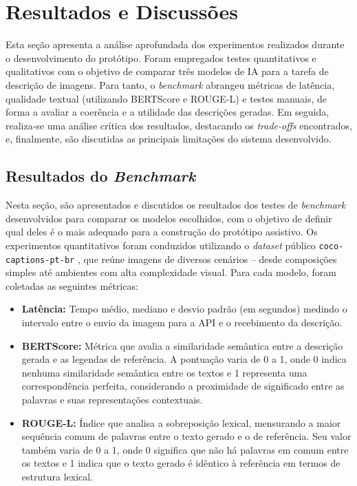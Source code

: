 \chapter{Resultados e Discussões} \label{cap:04}

Esta seção apresenta a análise aprofundada dos experimentos realizados durante o desenvolvimento do protótipo. Foram empregados testes quantitativos e qualitativos com o objetivo de comparar três modelos de IA para a tarefa de descrição de imagens. Para tanto, o \textit{benchmark} abrangeu métricas de latência, qualidade textual (utilizando BERTScore e ROUGE-L) e testes manuais, de forma a avaliar a coerência e a utilidade das descrições geradas. Em seguida, realiza-se uma análise crítica dos resultados, destacando os \textit{trade-offs} encontrados, e, finalmente, são discutidas as principais limitações do sistema desenvolvido.

\section{Resultados do \textit{Benchmark}}

Nesta seção, são apresentados e discutidos os resultados dos testes de \textit{benchmark} desenvolvidos para comparar os modelos escolhidos, com o objetivo de definir qual deles é o mais adequado para a construção do protótipo assistivo. Os experimentos quantitativos foram conduzidos utilizando o \textit{dataset} público \lstinline{coco-captions-pt-br} \cite{bromonschenkel2024cocopt}, que reúne imagens de diversos cenários – desde composições simples até ambientes com alta complexidade visual. Para cada modelo, foram coletadas as seguintes métricas:

\begin{itemize}
    \item \textbf{Latência:} Tempo médio, mediano e desvio padrão (em segundos) medindo o intervalo entre o envio da imagem para a API e o recebimento da descrição.
    \item \textbf{BERTScore:} Métrica que avalia a similaridade semântica entre a descrição gerada e as legendas de referência. A pontuação varia de 0 a 1, onde 0 indica nenhuma similaridade semântica entre os textos e 1 representa uma correspondência perfeita, considerando a proximidade de significado entre as palavras e suas representações contextuais.
    \item \textbf{ROUGE-L:} Índice que analisa a sobreposição lexical, mensurando a maior sequência comum de palavras entre o texto gerado e o de referência. Seu valor também varia de 0 a 1, onde 0 significa que não há palavras em comum entre os textos e 1 indica que o texto gerado é idêntico à referência em termos de estrutura lexical.
\end{itemize}


